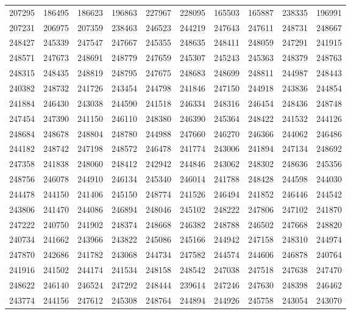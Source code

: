 \documentclass[11pt]{article}
\numberwithin{equation}{section}
\theoremstyle{definition}
\theoremstyle{remark}
\begin{document}
{\begin{longtable}{rrrrrrrrrr}
207295 & 186495 & 186623 & 196863 & 227967 & 228095 & 165503 & 165887 & 238335 & 196991\\
207231 & 206975 & 207359 & 238463 & 246523 & 244219 & 247643 & 247611 & 248731 & 248667\\
248427 & 245339 & 247547 & 247667 & 245355 & 248635 & 248411 & 248059 & 247291 & 241915\\
248571 & 247673 & 248691 & 248779 & 247659 & 245307 & 245243 & 245363 & 248379 & 248763\\
248315 & 248435 & 248819 & 248795 & 247675 & 248683 & 248699 & 248811 & 244987 & 248443\\
240382 & 248732 & 241726 & 243454 & 244798 & 241846 & 247150 & 244918 & 243836 & 244854\\
241884 & 246430 & 243038 & 244590 & 241518 & 246334 & 248316 & 246454 & 248436 & 248748\\
247454 & 247390 & 241150 & 246110 & 248380 & 246390 & 245364 & 248422 & 241532 & 244126\\
248684 & 248678 & 248804 & 248780 & 244988 & 247660 & 246270 & 246366 & 244062 & 246486\\
244182 & 248742 & 247198 & 248572 & 246478 & 241774 & 243006 & 241894 & 247134 & 248692\\
247358 & 241838 & 248060 & 248412 & 242942 & 244846 & 243062 & 248302 & 248636 & 245356\\
248756 & 246078 & 244910 & 246134 & 245340 & 246014 & 241788 & 248428 & 244598 & 244030\\
244478 & 244150 & 241406 & 245150 & 248774 & 241526 & 246494 & 241852 & 246446 & 244542\\
243806 & 241470 & 244086 & 246894 & 248046 & 245102 & 248222 & 247806 & 247102 & 241870\\
247222 & 240750 & 241902 & 248374 & 248668 & 246382 & 248788 & 246502 & 247668 & 248820\\
240734 & 241662 & 243966 & 243822 & 245086 & 245166 & 244942 & 247158 & 248310 & 244974\\
247870 & 242686 & 241782 & 243068 & 244734 & 247582 & 244574 & 244606 & 246878 & 240764\\
241916 & 241502 & 244174 & 241534 & 248158 & 248542 & 247038 & 247518 & 247638 & 247470\\
248622 & 246140 & 246524 & 247292 & 248444 & 239614 & 247246 & 247630 & 248398 & 246462\\
243774 & 244156 & 247612 & 245308 & 248764 & 244894 & 244926 & 245758 & 243054 & 243070\\

\end{longtable}}
\end{document}

